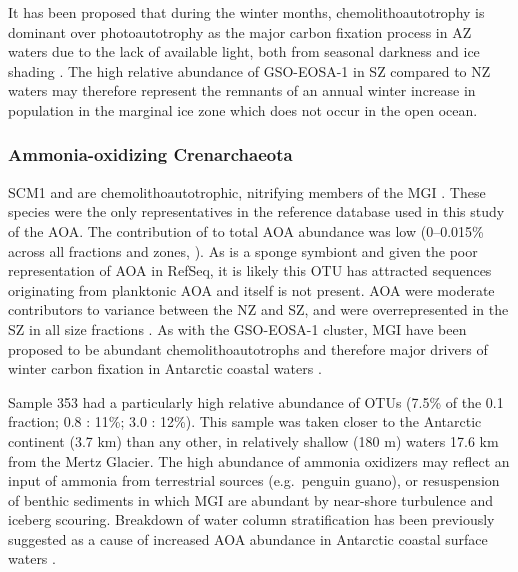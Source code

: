 It has been proposed that during the winter months, chemolithoautotrophy is dominant over photoautotrophy as the major carbon fixation process in \ac{AZ} waters due to the lack of available light, both from seasonal darkness and ice shading \cite{Grzymski:2012ej}.
The high relative abundance of \ac{GSO-EOSA-1} in \ac{SZ} compared to \ac{NZ} waters may therefore represent the remnants of an annual winter increase in population in the marginal ice zone which does not occur in the open ocean.

\subsubsection{Ammonia-oxidizing Crenarchaeota}

 SCM1 and  are chemolithoautotrophic, nitrifying members of the \ac{MGI} \cite{Preston:1996vi,Walker:2010ww}.
These species were the only representatives in the reference database used in this study of the \ac{AOA}.
The contribution of  to total \ac{AOA} abundance was low (0--0.015\% across all fractions and zones, ).
As  is a sponge symbiont \cite{Preston:1996vi} and given the poor representation of \ac{AOA} in RefSeq, it is likely this \ac{OTU} has attracted sequences originating from planktonic \ac{AOA} and  itself is not present.
\ac{AOA} were moderate contributors to variance between the \ac{NZ} and \ac{SZ}, and were overrepresented in the \ac{SZ} in all size fractions .
As with the GSO-EOSA-1 cluster, \ac{MGI} have been proposed to be abundant chemolithoautotrophs and therefore major drivers of winter carbon fixation in Antarctic coastal waters \cite{Grzymski:2012ej,Williams:2012bs}.

Sample 353 had a particularly high relative abundance of  \acp{OTU} (7.5\% of the 0.1 \micron{} fraction; 0.8 \micron: 11\%; 3.0 \micron: 12\%).
This sample was taken closer to the Antarctic continent (3.7 km) than any other, in relatively shallow (180 m) waters 17.6 km from the Mertz Glacier.
The high abundance of ammonia oxidizers may reflect an input of ammonia from terrestrial sources (e.g.\ penguin guano), or resuspension of benthic sediments in which \ac{MGI} are abundant \cite{Bowman:2003fa} by near-shore turbulence and iceberg scouring.
Breakdown of water column stratification has been previously suggested as a cause of increased \ac{AOA} abundance in Antarctic coastal surface waters \cite{Kalanetra:2009bv}.

